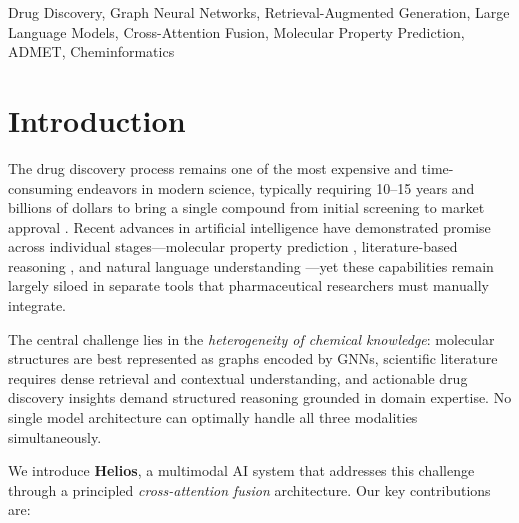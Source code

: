 \documentclass[conference]{IEEEtran}
\begin{document}
\begin{IEEEkeywords}
Drug Discovery, Graph Neural Networks, Retrieval-Augmented Generation, Large Language Models, Cross-Attention Fusion, Molecular Property Prediction, ADMET, Cheminformatics
\end{IEEEkeywords}

\section{Introduction}

The drug discovery process remains one of the most expensive and time-consuming endeavors in modern science, typically requiring 10--15 years and billions of dollars to bring a single compound from initial screening to market approval \cite{dimasi2016}. Recent advances in artificial intelligence have demonstrated promise across individual stages---molecular property prediction \cite{gilmer2017mpnn, ying2021graphormer}, literature-based reasoning \cite{lewis2020rag}, and natural language understanding \cite{touvron2023llama}---yet these capabilities remain largely siloed in separate tools that pharmaceutical researchers must manually integrate.

The central challenge lies in the \textit{heterogeneity of chemical knowledge}: molecular structures are best represented as graphs encoded by GNNs, scientific literature requires dense retrieval and contextual understanding, and actionable drug discovery insights demand structured reasoning grounded in domain expertise. No single model architecture can optimally handle all three modalities simultaneously.

We introduce \textbf{Helios}, a multimodal AI system that addresses this challenge through a principled \textit{cross-attention fusion} architecture. Our key contributions are:
\end{document}
